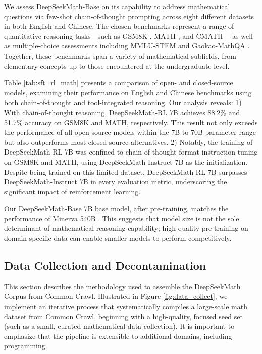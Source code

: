 We assess DeepSeekMath-Base on its capability to address mathematical questions via few-shot chain-of-thought prompting \citep{cot} across eight different datasets in both English and Chinese. The chosen benchmarks represent a range of quantitative reasoning tasks—such as GSM8K \citep{gsm8k}, MATH \citep{MATH}, and CMATH \citep{wei2023cmath}—as well as multiple-choice assessments including MMLU-STEM \citep{mmlu} and Gaokao-MathQA \citep{agieval}. Together, these benchmarks span a variety of mathematical subfields, from elementary concepts up to those encountered at the undergraduate level.

Table \ref{tab:sft_rl_math} presents a comparison of open- and closed-source models, examining their performance on English and Chinese benchmarks using both chain-of-thought and tool-integrated reasoning. Our analysis reveals: 1) With chain-of-thought reasoning, DeepSeekMath-RL 7B achieves 88.2\% and 51.7\% accuracy on GSM8K and MATH, respectively. This result not only exceeds the performance of all open-source models within the 7B to 70B parameter range but also outperforms most closed-source alternatives. 2) Notably, the training of DeepSeekMath-RL 7B was confined to chain-of-thought-format instruction tuning on GSM8K and MATH, using DeepSeekMath-Instruct 7B as the initialization. Despite being trained on this limited dataset, DeepSeekMath-RL 7B surpasses DeepSeekMath-Instruct 7B in every evaluation metric, underscoring the significant impact of reinforcement learning.

    \item Our DeepSeekMath-Base 7B base model, after pre-training, matches the performance of Minerva 540B \citep{minerva}. This suggests that model size is not the sole determinant of mathematical reasoning capability; high-quality pre-training on domain-specific data can enable smaller models to perform competitively.

\subsection{Data Collection and Decontamination} This section describes the methodology used to assemble the DeepSeekMath Corpus from Common Crawl. Illustrated in Figure \ref{fig:data_collect}, we implement an iterative process that systematically compiles a large-scale math dataset from Common Crawl, beginning with a high-quality, focused seed set (such as a small, curated mathematical data collection). It is important to emphasize that the pipeline is extensible to additional domains, including programming.

